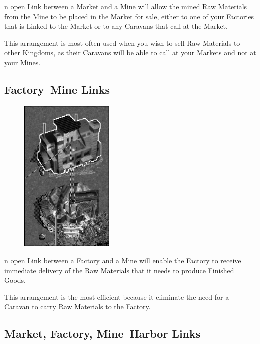 n open Link between a Market and a Mine will allow the mined Raw Materials from the Mine to be placed in the Market for sale, either to one of your Factories that is Linked to the Market or to any Caravans that call at the Market.

This arrangement is most often used when you wish to sell Raw Materials to other Kingdoms, as their Caravans will be able to call at your Markets and not at your Mines.

\clearpage

\subsection{Factory–Mine Links}


\begin{figure}
	\vspace{-20pt}
	\begin{center}
		\includegraphics[width=0.4\textwidth]{Ilink_minefactory}
	\end{center}
	\vspace{-20pt}
\end{figure}

n open Link between a Factory and a Mine will enable the Factory to receive immediate delivery of the Raw Materials that it needs to produce Finished Goods.

This arrangement is the most efficient because it eliminate the need for a Caravan to carry Raw Materials to the Factory.

\clearpage

\subsection{Market, Factory, Mine–Harbor Links}

